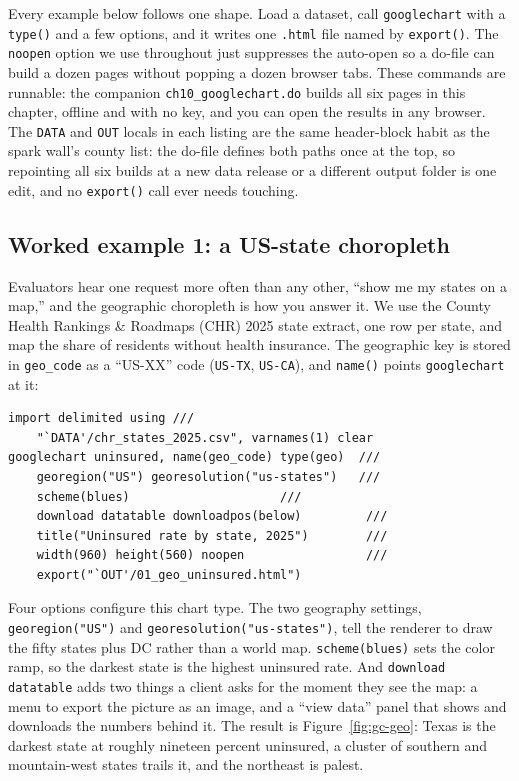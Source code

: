 Every example below follows one shape. Load a dataset, call \texttt{googlechart} with a \texttt{type()} and a few options, and it writes one \texttt{.html} file named by \texttt{export()}. The \texttt{noopen} option we use throughout just suppresses the auto-open so a do-file can build a dozen pages without popping a dozen browser tabs. These commands are runnable: the companion \texttt{ch10\_googlechart.do} builds all six pages in this chapter, offline and with no key, and you can open the results in any browser. The \texttt{DATA} and \texttt{OUT} locals in each listing are the same header-block habit as the spark wall's county list: the do-file defines both paths once at the top, so repointing all six builds at a new data release or a different output folder is one edit, and no \texttt{export()} call ever needs touching.

\subsection{Worked example 1: a US-state choropleth}\label{sec:gc-geo}
Evaluators hear one request more often than any other, \enquote{show me my states on a map,} and the geographic choropleth is how you answer it. We use the County Health Rankings \& Roadmaps (CHR) 2025 state extract, one row per state, and map the share of residents without health insurance. The geographic key is stored in \texttt{geo\_code} as a \enquote{US-XX} code (\texttt{US-TX}, \texttt{US-CA}), and \texttt{name()} points \texttt{googlechart} at it:
\par
{\footnotesize
\begin{verbatim}
import delimited using ///
    "`DATA'/chr_states_2025.csv", varnames(1) clear
googlechart uninsured, name(geo_code) type(geo)  ///
    georegion("US") georesolution("us-states")   ///
    scheme(blues)                     ///
    download datatable downloadpos(below)         ///
    title("Uninsured rate by state, 2025")        ///
    width(960) height(560) noopen                 ///
    export("`OUT'/01_geo_uninsured.html")
\end{verbatim}
}
Four options configure this chart type. The two geography settings, \texttt{georegion("US")} and \texttt{georesolution("us-states")}, tell the renderer to draw the fifty states plus DC rather than a world map. \texttt{scheme(blues)} sets the color ramp, so the darkest state is the highest uninsured rate. And \texttt{download datatable} adds two things a client asks for the moment they see the map: a menu to export the picture as an image, and a \enquote{view data} panel that shows and downloads the numbers behind it. The result is Figure~\ref{fig:gc-geo}: Texas is the darkest state at roughly nineteen percent uninsured, a cluster of southern and mountain-west states trails it, and the northeast is palest.

